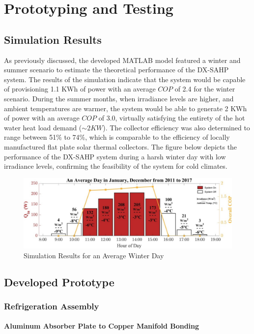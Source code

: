 \chapter{Prototyping and Testing}

\section{Simulation Results}

As previously discussed, the developed MATLAB model featured a winter and summer scenario to estimate the theoretical performance of the DX-SAHP system. The results of the simulation indicate that the system would be capable of provisioning 1.1 KWh of power with an average $COP$ of 2.4 for the winter scenario. During the summer months, when irradiance levels are higher, and ambient temperatures are warmer, the system would be able to generate 2 KWh of power with an average $COP$ of 3.0, virtually satisfying the entirety of the hot water heat load demand ($\sim2KW$). The collector efficiency was also determined to range between 51\% to 74\%, which is comparable to the efficiency of locally manufactured flat plate solar thermal collectors. The figure below depicts the performance of the DX-SAHP system during a harsh winter day with low irradiance levels, confirming the feasibility of the system for cold climates. 

\medskip
\begin{figure}[H]
    \centering
    \includegraphics[width=\textwidth]{images/simulation.jpg}
    \caption{Simulation Results for an Average Winter Day}
\end{figure}

\section{Developed Prototype}
\subsection{Refrigeration Assembly}
\subsubsection{Aluminum Absorber Plate to Copper Manifold Bonding}

